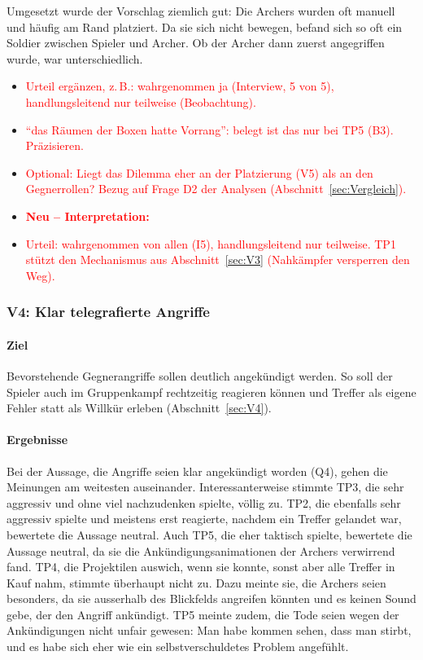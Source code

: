 \documentclass[../Main.tex]{subfiles}
\begin{document}
Umgesetzt wurde der Vorschlag ziemlich gut: Die Archers wurden oft manuell und häufig am Rand platziert. Da sie sich nicht bewegen, befand sich so oft ein Soldier zwischen Spieler und Archer. Ob der Archer dann zuerst angegriffen wurde, war unterschiedlich.

\begin{itemize}[leftmargin=1.5cm]
    \item \textcolor{red}{Urteil ergänzen, z.\,B.: wahrgenommen ja (Interview, 5 von 5), handlungsleitend nur teilweise (Beobachtung).}
    \item \textcolor{red}{\enquote{das Räumen der Boxen hatte Vorrang}: belegt ist das nur bei TP5 (B3). Präzisieren.}
    \item \textcolor{red}{Optional: Liegt das Dilemma eher an der Platzierung (V5) als an den Gegnerrollen? Bezug auf Frage D2 der Analysen (Abschnitt~\ref{sec:Vergleich}).}
\end{itemize}

\begin{itemize}[leftmargin=1.5cm]
    \item \textcolor{red}{\textbf{Neu -- Interpretation:}}
    \item \textcolor{red}{Urteil: wahrgenommen von allen (I5), handlungsleitend nur teilweise. TP1 stützt den Mechanismus aus Abschnitt~\ref{sec:V3} (Nahkämpfer versperren den Weg).}
\end{itemize}

\subsubsection{V4: Klar telegrafierte Angriffe}

\paragraph{Ziel}
Bevorstehende Gegnerangriffe sollen deutlich angekündigt werden. So soll der Spieler auch im Gruppenkampf rechtzeitig reagieren können und Treffer als eigene Fehler statt als Willkür erleben (Abschnitt~\ref{sec:V4}).

\paragraph{Ergebnisse}
Bei der Aussage, die Angriffe seien klar angekündigt worden (Q4), gehen die Meinungen am weitesten auseinander. Interessanterweise stimmte TP3, die sehr aggressiv und ohne viel nachzudenken spielte, völlig zu. TP2, die ebenfalls sehr aggressiv spielte und meistens erst reagierte, nachdem ein Treffer gelandet war, bewertete die Aussage neutral. Auch TP5, die eher taktisch spielte, bewertete die Aussage neutral, da sie die Ankündigungsanimationen der Archers verwirrend fand. TP4, die Projektilen auswich, wenn sie konnte, sonst aber alle Treffer in Kauf nahm, stimmte überhaupt nicht zu. Dazu meinte sie, die Archers seien besonders, da sie ausserhalb des Blickfelds angreifen könnten und es keinen Sound gebe, der den Angriff ankündigt. TP5 meinte zudem, die Tode seien wegen der Ankündigungen nicht unfair gewesen: Man habe kommen sehen, dass man stirbt, und es habe sich eher wie ein selbstverschuldetes Problem angefühlt.
\end{document}
